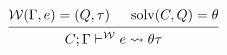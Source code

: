 \documentclass[12pt]{article}
\begin{document}
\pagestyle{empty}

\[
    \begin{prooftree}
        \hypo{\mathcal{W}(\Gamma, e) = (Q, \tau)}
        \hypo{\mathrm{solv}(C, Q) = \theta}
        \infer2{C; \Gamma \vdash^\mathcal{W} e \rightsquigarrow \theta\tau}
    \end{prooftree}
\]
\end{document}
